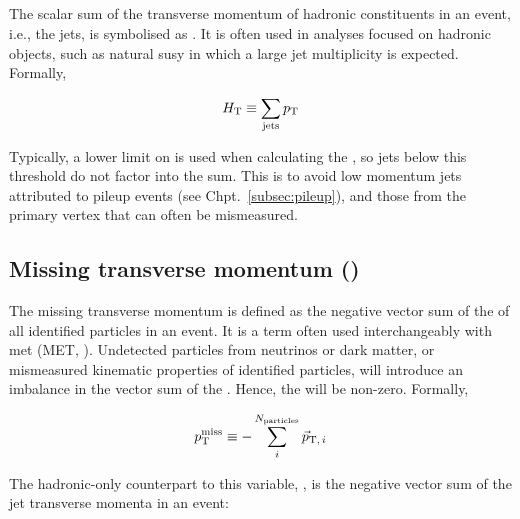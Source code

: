 



\subsection{\texorpdfstring{\HT}{HT}}
\label{subsec:theory_ht}


The scalar sum of the transverse momentum of hadronic constituents in an event, i.e., the \glspl{jet}, is symbolised as \HT. It is often used in analyses focused on hadronic objects, such as natural \acrlong{susy} in which a large jet multiplicity is expected. Formally,

\begin{equation}
    H_{\mathrm{T}} \equiv \sum_{\mathrm{jets}} p_{\mathrm{T}}
    \label{eq:ht_definition}
\end{equation}

Typically, a lower limit on \pt is used when calculating the \HT, so jets below this threshold do not factor into the sum. This is to avoid low momentum jets attributed to pileup events (see Chpt.~\ref{subsec:pileup}), and those from the primary vertex that can often be mismeasured.




\subsection{Missing transverse momentum (\texorpdfstring{\ptmiss}{ptmiss})}
\label{subsec:theory_met}

The missing transverse momentum \ptmiss is defined as the negative vector sum of the \pt of all identified particles in an event. It is a term often used interchangeably with \gls{met} (MET, ). Undetected particles from neutrinos or dark matter, or mismeasured kinematic properties of identified particles, will introduce an imbalance in the vector sum of the \pt. Hence, the \ptmiss will be non-zero. Formally,

\begin{equation}
    p_{\mathrm{T}}^\text{miss} \equiv - \sum_i^{N_{\mathrm{particles}}} {\vec p}_{\mathrm{T}, \, i}
    \label{eq:met_definition}
\end{equation}

The hadronic-only counterpart to this variable, \mht, is the negative vector sum of the jet transverse momenta in an event:

